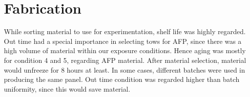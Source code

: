 \begin{table}[htbp]
\centering
\caption{Material exposure conditions}
\label{materialconditions}
\end{table}

\section{Fabrication}
\label{testfabrication}

While sorting material to use for experimentation, shelf life was highly regarded. Out time had a special importance in selecting tows for AFP, since there was a high volume of material within our exposure conditions. Hence aging was mostly for condition 4 and 5, regarding AFP material. After material selection, material would unfreeze for 8 hours at least. In some cases, different batches were used in producing the same panel. Out time condition was regarded higher than batch uniformity, since this would save material.



